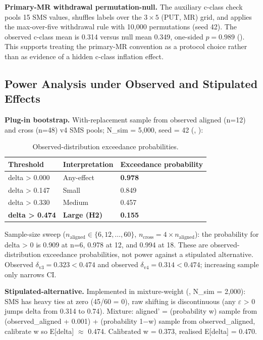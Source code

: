 \documentclass[review,12pt,authoryear]{elsarticle}
\begin{document}
\textbf{Primary-MR withdrawal permutation-null.} The auxiliary c-class
check pools 15 SMS values, shuffles labels over the $3 \times 5$ (PUT,
MR) grid, and applies the max-over-five withdrawal rule with 10,000
permutations (seed 42). The observed c-class mean is 0.314 versus null
mean 0.349, one-sided $p = 0.989$
(). This supports treating
the primary-MR convention as a protocol choice rather than as evidence of
a hidden c-class inflation effect.

\subsection{Power Analysis under Observed and Stipulated Effects}\label{d.3-power-analysis-plug-in-and-stipulated-alternative}

\textbf{Plug-in bootstrap.} With-replacement sample from observed
aligned (n=12) and cross (n=48) v4 SMS pools; N\_sim = 5,000, seed = 42
(, ):

{\def\LTcaptype{table} %
\begin{longtable}[]{@{}lll@{}}
\caption{Observed-distribution exceedance probabilities.}\label{tab:p2-23}\\
\toprule\noalign{}
Threshold & Interpretation & Exceedance probability \\
\midrule\noalign{}
\endfirsthead
\endhead
\bottomrule\noalign{}
\endlastfoot
delta \textgreater{} 0.000 & Any-effect & \textbf{0.978} \\
delta \textgreater{} 0.147 & Small & 0.849 \\
delta \textgreater{} 0.330 & Medium & 0.457 \\
\textbf{delta \textgreater{} 0.474} & \textbf{Large (H2)} &
\textbf{0.155} \\
\end{longtable}
}

Sample-size sweep ($n_{\mathrm{aligned}} \in \{6, 12, \ldots, 60\}$, $n_{\mathrm{cross}} = 4 \times n_{\mathrm{aligned}}$):
the probability for delta \textgreater{} 0 is 0.909 at n=6, 0.978 at
12, and 0.994 at 18. These are observed-distribution exceedance
probabilities, not power against a stipulated alternative. Observed
$\delta_{\mathrm{v3}} = 0.323 < 0.474$ and observed
$\delta_{\mathrm{v4}} = 0.314 < 0.474$; increasing sample only narrows CI.

\textbf{Stipulated-alternative.} Implemented in
mixture-weight (,
N\_sim = 2,000): SMS has heavy ties at zero (45/60 = 0), raw shifting is
discontinuous (any $\varepsilon$ \textgreater{} 0 jumps delta from 0.314 to 0.74).
Mixture: aligned' = (probability w) sample from (observed\_aligned +
0.001) + (probability 1−w) sample from observed\_aligned, calibrate w so
E{[}delta{]} $\approx$ 0.474. Calibrated w = 0.373, realised E{[}delta{]} =
0.470.
\end{document}
